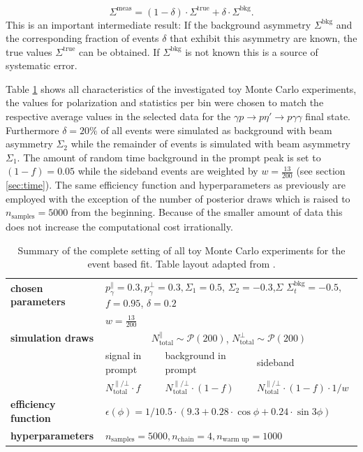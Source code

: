 \begin{equation}
	\Sigma^\text{meas}=\left(1-\delta\right)\cdot\Sigma^{\text{true}}+\delta\cdot\Sigma^{\text{bkg}}.
	\label{eq:sigmeas}
\end{equation}
This is an important intermediate result: If the background asymmetry $\Sigma^\text{bkg}$ and the corresponding fraction of events $\delta$ that exhibit this asymmetry are known, the true values $\Sigma^\text{true}$ can be obtained. If $\Sigma^\text{bkg}$ is not known this is a source of systematic error.

Table \ref{tab:mcsum1} shows all characteristics of the investigated toy Monte Carlo experiments, the values for polarization and statistics per bin were chosen to match the respective average values in the selected data for the $\gamma p \to p\eta'\to p\gamma\gamma$ final state. Furthermore $\delta=20\%$ of all events were simulated as background with beam asymmetry $\Sigma_2$ while the remainder of events is simulated with beam asymmetry $\Sigma_1$. The amount of random time background in the prompt peak is set to $(1-f)=0.05$ while the sideband events are weighted by $w=\frac{13}{200}$ (see section \ref{sec:time}). The same efficiency function and hyperparameters as previously are employed with the exception of the number of posterior draws which is raised to $n_\text{samples}=5000$ from the beginning. Because of the smaller amount of data this does not increase the computational cost irrationally.
\begin{table}[htbp]
	
	\renewcommand{\arraystretch}{1.5}
	\centering
	\begin{tabularx}{\linewidth}{l|XXX}
		\toprule
		\textbf{chosen parameters} & \multicolumn{3}{l}{$p_\gamma^\parallel=0.3,p_\gamma^\bot=0.3,\Sigma_1=0.5$, $\Sigma_2=-0.3$,$\Sigma$ $\Sigma^\text{bkg}_t=-0.5$, $f=0.95$, $\delta=0.2$}\\ &\multicolumn{3}{l}{$w=\frac{13}{200}$}\\
		\hline
		\textbf{simulation draws} &\multicolumn{3}{c}{$ N^\parallel_{\text{total}}\sim\mathcal{P}(200)$, $ N^\bot_{\text{total}}\sim\mathcal{P}(200)$}\\
		\cline{2-4}
		&signal in prompt&background in prompt& sideband \\
		&$N^{\parallel/\bot}_\text{total}\cdot f$&$N^{\parallel/\bot}_\text{total}\cdot\left(1-f\right)$&$N^{\parallel/\bot}_\text{total}\cdot\left(1-f\right)\cdot1/w$\\
		\hline
		\textbf{efficiency function}&\multicolumn{3}{l}{$\epsilon\left(\phi\right)=1/10.5\cdot\left(9.3+0.28\cdot\cos\phi+0.24\cdot\sin3\phi\right)$}\\
		\hline
		\textbf{hyperparameters}&\multicolumn{3}{l}{$n_\text{samples}=5000,n_\text{chain}=4,n_\text{warm up}=1000$}\\
		\bottomrule
	\end{tabularx}
	\caption{Summary of the complete setting of all toy Monte Carlo experiments for the event based fit. Table layout adapted from \cite{farahphd}.}
	\label{tab:mcsum1}
\end{table}
